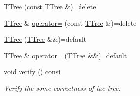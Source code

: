 \begin{DoxyCompactItemize}
\hyperlink{classTTree_ad7fb8543e084eea4a24571f3cb979555}{T\+Tree} (const \hyperlink{classTTree}{T\+Tree} \&)=delete
\item 
\hyperlink{classTTree}{T\+Tree} \& \hyperlink{classTTree_a3c4da2361311ac5903822a2151865ae6}{operator=} (const \hyperlink{classTTree}{T\+Tree} \&)=delete
\item 
\hyperlink{classTTree_acfa1c1f035255298fd22be8810d5d672}{T\+Tree} (\hyperlink{classTTree}{T\+Tree} \&\&)=default
\item 
\hyperlink{classTTree}{T\+Tree} \& \hyperlink{classTTree_a8751a54d1c80d2f822d84a98e5c96293}{operator=} (\hyperlink{classTTree}{T\+Tree} \&\&)=default
\item 
void \hyperlink{classTTree_a561ca642fa6104a2275c30974b57e221}{verify} () const 
\begin{DoxyCompactList}\small\item\em Verify the some correctness of the tree. \end{DoxyCompactList}\end{DoxyCompactItemize}
